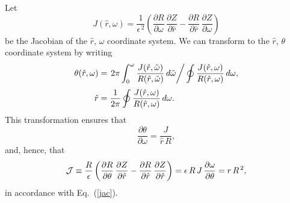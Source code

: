 \documentclass[12pt,prb,aps,notitlepage]{revtex4-1}
\begin{document}
Let
\begin{equation}
J(\hat{r},\omega) = \frac{1}{\epsilon^{\,2}}\left(\frac{\partial R}{\partial\omega}\,\frac{\partial Z}{\partial \hat{r}} -\frac{\partial R}{\partial \hat{r}}\,\frac{\partial Z}{\partial \omega}\right)
\end{equation}
be the Jacobian of the $\hat{r}$, $\omega$ coordinate system. We can transform to the $\hat{r}$, $\theta$ coordinate system 
by writing
\begin{align}\label{e11}
\theta(\hat{r},\omega) &= \left.2\pi\int_0^\omega \frac{J(\hat{r},\tilde{\omega})}{R(\hat{r},\tilde{\omega})}\,d\tilde{\omega}\right/\oint\frac{J(\hat{r},\omega)}{R(\hat{r},\omega)}\,d\omega,\\[0.5ex]
\hat{r}&=\frac{1}{2\pi}\oint\frac{J(\hat{r},\omega)}{R(\hat{r},\omega)}\,d\omega.\label{e12}
\end{align}
This transformation ensures that 
\begin{equation}
\frac{\partial\theta}{\partial\omega} = \frac{J}{\hat{r}\,R},
\end{equation}
and, hence, that 
\begin{equation}
{\cal J} \equiv \frac{R}{\epsilon} \left(\frac{\partial R}{\partial\theta}\,\frac{\partial Z}{\partial \hat{r}} -\frac{\partial R}{\partial \hat{r}}\,\frac{\partial Z}{\partial \hat{r}}\right)
=\epsilon\, R\,J\,\frac{\partial\omega}{\partial\theta} =r\,R^{\,2},
\end{equation}
in accordance with Eq.~(\ref{jac}). 
\end{document}
